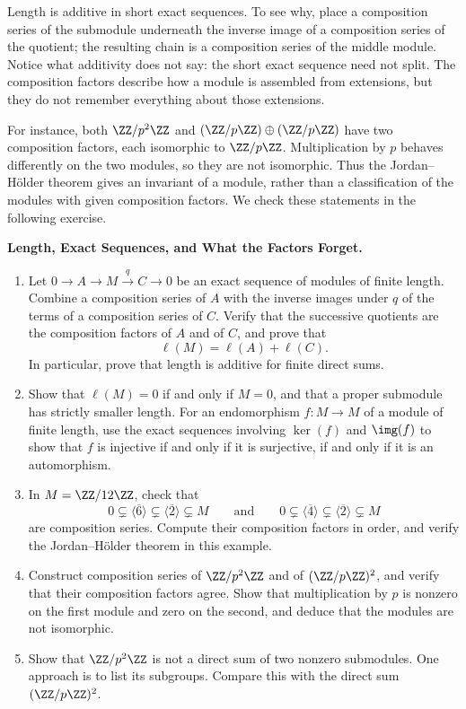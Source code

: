 \documentclass[12pt,reqno]{amsart}
\begin{document}
Length is additive in short exact sequences. To see why, place a composition series of the submodule underneath the inverse image of a composition series of the quotient; the resulting chain is a composition series of the middle module. Notice what additivity does not say: the short exact sequence need not split. The composition factors describe how a module is assembled from extensions, but they do not remember everything about those extensions.

For instance, both $\ZZ/p^2\ZZ$ and $(\ZZ/p\ZZ)\oplus(\ZZ/p\ZZ)$ have two composition factors, each isomorphic to $\ZZ/p\ZZ$. Multiplication by $p$ behaves differently on the two modules, so they are not isomorphic. Thus the Jordan--H\"older theorem gives an invariant of a module, rather than a classification of the modules with given composition factors. We check these statements in the following exercise.

\hrulefill

\begin{problems}
\item\label{c:length} \textbf{Length, Exact Sequences, and What the Factors Forget.}
\begin{enumerate}
\item Let $0\to A\to M\xrightarrow{q}C\to0$ be an exact sequence of modules of finite length. Combine a composition series of $A$ with the inverse images under $q$ of the terms of a composition series of $C$. Verify that the successive quotients are the composition factors of $A$ and of $C$, and prove that
\[
\ell(M)=\ell(A)+\ell(C).
\]
In particular, prove that length is additive for finite direct sums.
\item Show that $\ell(M)=0$ if and only if $M=0$, and that a proper submodule has strictly smaller length. For an endomorphism $f:M\to M$ of a module of finite length, use the exact sequences involving $\ker(f)$ and $\img(f)$ to show that $f$ is injective if and only if it is surjective, if and only if it is an automorphism.
\item In $M=\ZZ/12\ZZ$, check that
\[
0\subsetneq\langle\overline6\rangle\subsetneq\langle\overline2\rangle\subsetneq M
\qquad\text{and}\qquad
0\subsetneq\langle\overline4\rangle\subsetneq\langle\overline2\rangle\subsetneq M
\]
are composition series. Compute their composition factors in order, and verify the Jordan--H\"older theorem in this example.
\item Construct composition series of $\ZZ/p^2\ZZ$ and of $(\ZZ/p\ZZ)^2$, and verify that their composition factors agree. Show that multiplication by $p$ is nonzero on the first module and zero on the second, and deduce that the modules are not isomorphic.
\item Show that $\ZZ/p^2\ZZ$ is not a direct sum of two nonzero submodules. One approach is to list its subgroups. Compare this with the direct sum $(\ZZ/p\ZZ)^2$.
\end{enumerate}
\end{problems}
\end{document}
